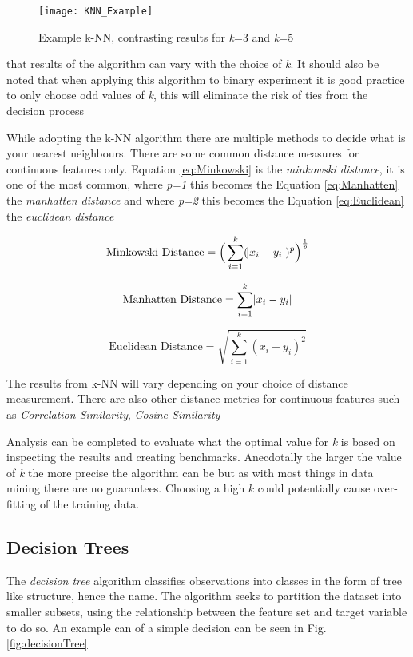 \begin{figure}[H]
	\texttt{[image: KNN\_Example]}
	\caption{Example k-NN, contrasting results for \textit{k}=3 and \textit{k}=5 }
	\label{fig:KNN_Example}
\end{figure}

that results of the algorithm can vary with the choice of \textit{k}. It should also be noted that when applying this algorithm to binary experiment it is good practice to only choose odd values of \textit{k}, this will eliminate the risk of ties from the decision process \citep{keller_fuzzy_1985} 

While adopting the k-NN algorithm there are multiple methods to decide what is your nearest neighbours. There are some common distance measures for continuous features only. Equation \ref{eq:Minkowski} is the \textit{minkowski distance}, it is one of the most common, where \textit{p=1} this becomes the Equation \ref{eq:Manhatten} the \textit{manhatten distance} and where \textit{p=2} this becomes the Equation \ref{eq:Euclidean} the \textit{euclidean distance}

\begin{equation} \label{eq:Minkowski}
	\text{Minkowski Distance}   = \Big(\sum_{i=1}^k (\abs{x_i-y_i})^p\Big)^\frac{1}{p}
\end{equation}

\begin{equation} \label{eq:Manhatten}
	\text{Manhatten Distance}   = \sum_{i=1}^k \abs{x_i-y_i}
\end{equation}

\begin{equation} \label{eq:Euclidean}
	\text{Euclidean Distance}   = \sqrt{\sum_{i=1}^k (x_i-y_i)^2}
\end{equation}

The results from k-NN will vary depending on your choice of distance measurement. There are also other distance metrics for continuous features such as \textit{Correlation Similarity}, \textit{Cosine Similarity} \citep{sarwar_item-based_2001}

Analysis can be completed to evaluate what the optimal value for \textit{k} is based on inspecting the results and creating benchmarks. Anecdotally the larger the value of \textit{k} the more precise the algorithm can be but as with most things in data mining there are no guarantees. Choosing a high $k$ could potentially cause over-fitting of the training data.

\subsection{Decision Trees} \label{decTrees}
The \textit{decision tree} algorithm classifies observations into classes in the form of tree like structure, hence the name. The algorithm seeks to partition the dataset into smaller subsets, using the relationship between the feature set and target variable to do so. An example can of a simple decision can be seen in Fig. \ref{fig:decisionTree}

